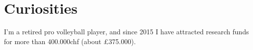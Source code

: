 \documentclass[]{plushcv}
\begin{document}
\begin{minipage}[t]{0.25\textwidth}


\section{Curiosities}
I'm a retired pro volleyball player, and since 2015 I have attracted research funds for more than 400.000chf (about £375.000).






\end{minipage} 
\end{document}
